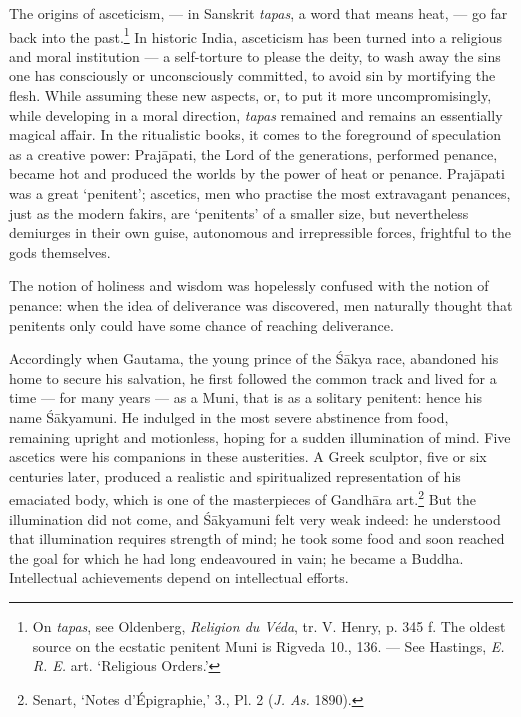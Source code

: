 \documentclass[a4paper, 11pt, oneside, english]{article}
\begin{document}
The origins of asceticism, --- in Sanskrit \emph{tapas}, a word that means heat, --- go far back into the past.\footnote{On \emph{tapas}, see Oldenberg, \emph{Religion du Véda}, tr. V. Henry, p. 345 f. The oldest source on the ecstatic penitent Muni is Rigveda 10., 136. --- See Hastings, \emph{E. R. E.} art. `Religious Orders.'} In historic India, asceticism has been turned into a religious and moral institution --- a self-torture to please the deity, to wash away the sins one has consciously or unconsciously committed, to avoid sin by mortifying the flesh. While assuming these new aspects, or, to put it more uncompromisingly, while developing in a moral direction, \emph{tapas} remained and remains an essentially magical affair. In the ritualistic books, it comes to the foreground of speculation as a creative power: Prajāpati, the Lord of the generations, performed penance, became hot and produced the worlds by the power of heat or penance. Prajāpati was a great `penitent'; ascetics, men who practise the most extravagant penances, just as the modern fakirs, are `penitents' of a smaller size, but nevertheless demiurges in their own guise, autonomous and irrepressible forces, frightful to the gods themselves.

The notion of holiness and wisdom was hopelessly confused with the notion of penance: when the idea of deliverance was discovered, men naturally thought that penitents only could have some chance of reaching deliverance.

Accordingly when Gautama, the young prince of the Śākya race, abandoned his home to secure his salvation, he first followed the common track and lived for a time --- for many years --- as a Muni, that is as a solitary penitent: hence his name Śākyamuni. He indulged in the most severe abstinence from food, remaining upright and motionless, hoping for a sudden illumination of mind. Five ascetics were his companions in these austerities. A Greek sculptor, five or six centuries later, produced a realistic and spiritualized representation of his emaciated body, which is one of the masterpieces of Gandhāra art.\footnote{Senart, `Notes d'Épigraphie,' 3., Pl. 2 (\emph{J. As.} 1890).} But the illumination did not come, and Śākyamuni felt very weak indeed: he understood that illumination requires strength of mind; he took some food and soon reached the goal for which he had long endeavoured in vain; he became a Buddha. Intellectual achievements depend on intellectual efforts.
\end{document}
